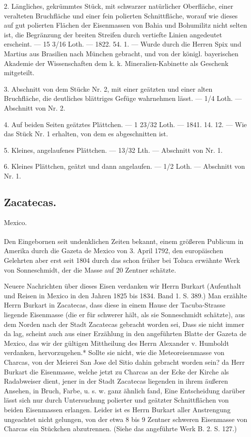 \documentclass[a4paper, 11pt, oneside, polutonikogreek, german]{article}
\begin{document}
2. Längliches, gekrümmtes Stück, mit schwarzer natürlicher Oberfläche, einer veralteten Bruchfläche und einer fein polierten Schnittfläche, worauf wie dieses auf gut polierten Flächen der Eisenmassen von Bahia und Bohumilitz nicht selten ist, die Begränzung der breiten Streifen durch vertiefte Linien angedeutet erscheint. — 15 3/16 Loth. — 1822. 54. 1. — Wurde durch die Herren Spix und Martius aus Brasilien nach München gebracht, und von der königl. bayerischen Akademie der Wissenschaften dem k. k. Mineralien-Kabinette als Geschenk mitgeteilt.

3. Abschnitt von dem Stücke Nr. 2, mit einer geätzten und einer alten Bruchfläche, die deutliches blättriges Gefüge wahrnehmen lässt. — 1/4 Loth. — Abschnitt von Nr. 2.

4. Auf beiden Seiten geätztes Plättchen. — 1 23/32 Loth. — 1841. 14. 12. — Wie das Stück Nr. 1 erhalten, von dem es abgeschnitten ist.

5. Kleines, angelaufenes Plättchen. — 13/32 Lth. — Abschnitt von Nr. 1.

6. Kleines Plättchen, geätzt und dann angelaufen. — 1/2 Loth. — Abschnitt von Nr. 1.
\subsection{Zacatecas.}
\begin{center}
\small
Mexico.
\end{center}
\paragraph{}
Den Eingebornen seit undenklichen Zeiten bekannt, einem größeren Publicum in Amerika durch die Gazeta de Mexico von 3. April 1792, den europäischen Gelehrten aber erst seit 1804 durch das schon früher bei Toluca erwähnte Werk von Sonneschmidt, der die Masse auf 20 Zentner schätzte.

Neuere Nachrichten über dieses Eisen verdanken wir Herrn Burkart (Aufenthalt und Reisen in Mexico in den Jahren 1825 bis 1834. Band 1. S. 389.) Man erzählte Herrn Burkart in Zacatecas, dass diese in einem Hause der Tacuba-Strasse liegende Eisenmasse (die er für schwerer hält, als sie Sonneschmidt schätzte), aus dem Norden nach der Stadt Zacatecas gebracht worden sei, Dass sie nicht immer da lag, scheint auch aus einer Erzählung in den angeführten Blatte der Gazeta de Mexico, das wir der gültigen Mittheilung des Herrn Alexander v. Humboldt verdanken, hervorzugehen.* Sollte sie nicht, wie die Meteoreisenmasse von Charcas, von der Meierei San Jose del Sitio dahin gebracht worden sein? da Herr Burkart die Eisenmasse, welche jetzt zu Charcas an der Ecke der Kirche als Radabweiser dient, jener in der Stadt Zacatecas liegenden in ihrem äußeren Ansehen, in Bruch, Farbe, u. s. w. ganz ähnlich fand, Eine Entscheidung darüber lässt sich nur durch Untersuchung polierter und geätzter Schnittflächen von beiden Eisenmassen erlangen. Leider ist es Herrn Burkart aller Anstrengung ungeachtet nicht gelungen, von der etwa 8 bis 9 Zentner schweren Eisenmasse von Charcas ein Stückchen abzutrennen. (Siehe das angeführte Werk B. 2. S. 127.)
\end{document}
